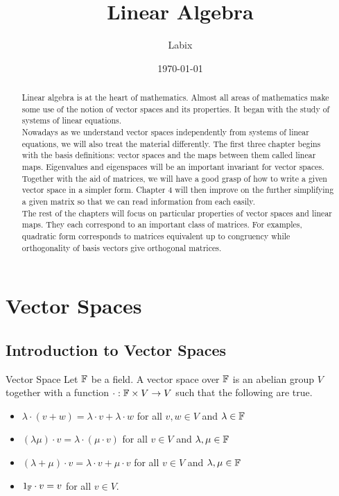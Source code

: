 \documentclass[a4paper]{article}
\title{Linear Algebra}
\author{Labix}
\date{\today}
\begin{document}
\maketitle
\begin{abstract}
Linear algebra is at the heart of mathematics. Almost all areas of mathematics make some use of the notion of vector spaces and its properties. It began with the study of systems of linear equations. \\

Nowadays as we understand vector spaces independently from systems of linear equations, we will also treat the material differently. The first three chapter begins with the basis definitions: vector spaces and the maps between them called linear maps. Eigenvalues and eigenspaces will be an important invariant for vector spaces. Together with the aid of matrices, we will have a good grasp of how to write a given vector space in a simpler form. Chapter 4 will then improve on the further simplifying a given matrix so that we can read information from each easily. \\

The rest of the chapters will focus on particular properties of vector spaces and linear maps. They each correspond to an important class of matrices. For examples, quadratic form corresponds to matrices equivalent up to congruency while orthogonality of basis vectors give orthogonal matrices. 
\end{abstract}
\pagebreak
\tableofcontents
\pagebreak

\section{Vector Spaces}
\subsection{Introduction to Vector Spaces}
\begin{defn}{Vector Space}{} Let $\mathbb{F}$ be a field. A vector space over $\mathbb{F}$ is an abelian group $V$ together with a function $\cdot:\mathbb{F}\times V\to V$ such that the following are true. 
\begin{itemize}
\item $\lambda\cdot(v+w)=\lambda\cdot v+\lambda\cdot w$ for all $v,w\in V$ and $\lambda\in\mathbb{F}$
\item $(\lambda\mu)\cdot v=\lambda\cdot(\mu\cdot v)$ for all $v\in V$ and $\lambda,\mu\in\mathbb{F}$
\item $(\lambda+\mu)\cdot v=\lambda\cdot v+\mu\cdot v$ for all $v\in V$ and $\lambda,\mu\in\mathbb{F}$
\item $1_{\mathbb{F}}\cdot v=v$ for all $v\in V$. 
\end{itemize}
\end{defn}
\end{document}
